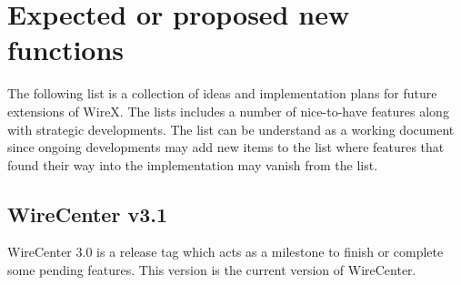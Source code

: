 \documentclass[11pt,a4paper,onepage,openany]{book}
\begin{document}
\section{Expected or proposed new functions}
The following list is a collection of ideas and implementation plans for future
extensions of WireX. The lists includes a number of nice-to-have features along
with strategic developments. The list can be understand as a working document
since ongoing developments may add new items to the list where features that
found their way into the implementation may vanish from the list.

\subsection{WireCenter v3.1}
WireCenter 3.0 is a release tag which acts as a milestone to finish or
complete some pending features. This version is the current version of WireCenter.
\end{document}
